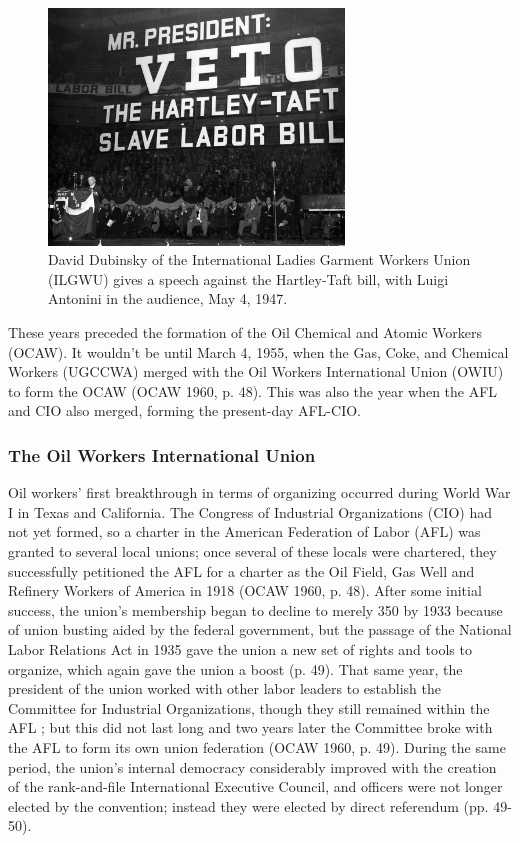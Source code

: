\documentclass[12pt]{article}
\begin{document}
\begin{figure}
  \centering
  \includegraphics[width=0.7\textwidth]{images/slave_labor_bill}
  \captionsetup{justification=centering, singlelinecheck=false, margin=2cm} 
  \caption{David Dubinsky of the International Ladies Garment Workers Union (ILGWU) gives a speech against the Hartley-Taft bill, with Luigi Antonini in the audience, May 4, 1947.}
  \label{fig:slave_labor_bill}
\end{figure}

These years preceded the formation of the Oil Chemical and Atomic Workers (OCAW). It wouldn’t be until March 4, 1955, when the Gas, Coke, and Chemical Workers (UGCCWA) merged with the Oil Workers International Union (OWIU) to form the OCAW (OCAW 1960, p. 48). This was also the year when the AFL and CIO also merged, forming the present-day AFL-CIO.

\subsubsection{The Oil Workers International Union}

Oil workers’ first breakthrough in terms of organizing occurred during World War I in Texas and California. The Congress of Industrial Organizations (CIO) had not yet formed, so a charter in the American Federation of Labor (AFL) was granted to several local unions; once several of these locals were chartered, they successfully petitioned the AFL for a charter as the Oil Field, Gas Well and Refinery Workers of America in 1918 (OCAW 1960, p. 48). After some initial success, the union’s membership began to decline to merely 350 by 1933 because of union busting aided by the federal government, but the passage of the National Labor Relations Act in 1935 gave the union a new set of rights and tools to organize, which again gave the union a boost (p. 49). That same year, the president of the union worked with other labor leaders to establish the Committee for Industrial Organizations, though they still remained within the AFL ; but this did not last long and two years later the Committee broke with the AFL to form its own union federation (OCAW 1960, p. 49). During the same period, the union’s internal democracy considerably improved with the creation of the rank-and-file International Executive Council, and officers were not longer elected by the convention; instead they were elected by direct referendum (pp. 49-50).
\end{document}
